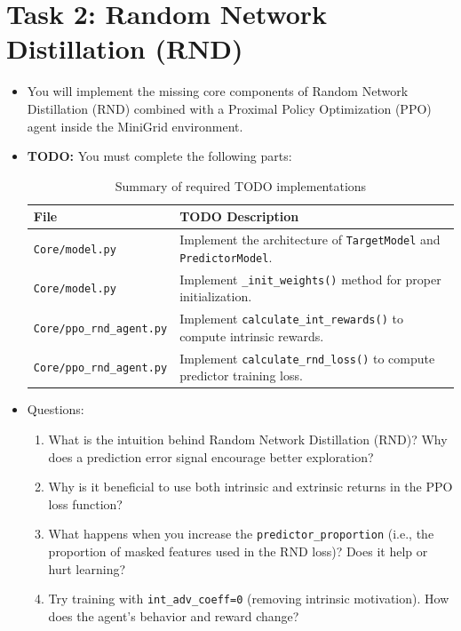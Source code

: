 \documentclass[12pt]{article}
\begin{document}
{{{\section{Task 2: Random Network Distillation (RND)}
\begin{itemize}[noitemsep]
    \item You will implement the missing core components of Random Network Distillation (RND) combined with
a Proximal Policy Optimization (PPO) agent inside the MiniGrid environment.
    \item \textbf{TODO:} You must complete the following parts:
    \begin{table}[h]
    \centering
    \renewcommand{\arraystretch}{1.3}
    \begin{tabular}{ll}
    \toprule
    \textbf{File} & \textbf{TODO Description} \\
    \midrule
    \texttt{Core/model.py} & Implement the architecture of \texttt{TargetModel} and \texttt{PredictorModel}. \\
    \texttt{Core/model.py} & Implement \texttt{\_init\_weights()} method for proper initialization. \\
    \texttt{Core/ppo\_rnd\_agent.py} & Implement \texttt{calculate\_int\_rewards()} to compute intrinsic rewards. \\
    \texttt{Core/ppo\_rnd\_agent.py} & Implement \texttt{calculate\_rnd\_loss()} to compute predictor training loss. \\
    \bottomrule
    \end{tabular}
    \caption{Summary of required TODO implementations}
    \end{table}
    
    \item Questions:
    \begin{enumerate}
    \item What is the intuition behind Random Network Distillation (RND)? Why does a prediction error signal encourage better exploration?
    
    \item Why is it beneficial to use both intrinsic and extrinsic returns in the PPO loss function?
    
    \item What happens when you increase the \texttt{predictor\_proportion} (i.e., the proportion of masked features used in the RND loss)? Does it help or hurt learning?
    
    \item Try training with \texttt{int\_adv\_coeff=0} (removing intrinsic motivation). How does the agent's behavior and reward change?
    

\end{enumerate}
\end{itemize}}}}
\end{document}

